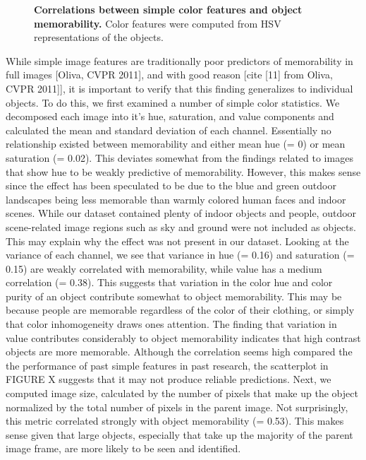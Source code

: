 \begin{figure}[t]
\centering
{}
\vspace{-5mm}\caption{\footnotesize\textbf{Correlations between simple color features and object memorability.} Color features were computed from HSV representations of the objects. }\label{fig:simple}
\end{figure}

While simple image features are traditionally poor predictors of memorability in full images [Oliva, CVPR 2011], and with good reason [cite [11] from Oliva, CVPR 2011]], it is important to verify that this finding generalizes to individual objects. To do this, we first examined a number of simple color statistics. We decomposed each image into it's hue, saturation, and value components and calculated the mean and standard deviation of each channel. Essentially no relationship existed between memorability and either mean hue (\rho = 0) or mean saturation (\rho = 0.02). This deviates somewhat from the findings related to images that show hue to be weakly predictive of memorability. However, this makes sense since the effect has been speculated to be due to the blue and green outdoor landscapes being less memorable than warmly colored human faces and indoor scenes. While our dataset contained plenty of indoor objects and people, outdoor scene-related image regions such as sky and ground were not included as objects. This may explain why the effect was not present in our dataset. Looking at the variance of each channel, we see that variance in hue (\rho = 0.16) and saturation (\rho = 0.15) are weakly correlated with memorability, while value has a medium correlation (\rho = 0.38). This suggests that variation in the color hue and color purity of an object contribute somewhat to object memorability. This may be because people are memorable regardless of the color of their clothing, or simply that color inhomogeneity draws ones attention. The finding that variation in value contributes considerably to object memorability indicates that high contrast objects are more memorable. Although the correlation seems high compared the the performance of past simple features in past research, the scatterplot in FIGURE X suggests that it may not produce reliable predictions. Next, we computed image size, calculated by the number of pixels that make up the object normalized by the total number of pixels in the parent image. Not surprisingly, this metric correlated strongly with object memorability (\rho = 0.53). This makes sense given that large objects, especially that take up the majority of the parent image frame, are more likely to be seen and identified. 